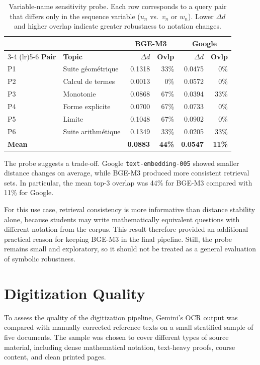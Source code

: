 \begin{table}[H]
\centering
\caption{Variable-name sensitivity probe. Each row corresponds to a query
pair that differs only in the sequence variable ($u_n$ vs.\ $v_n$ or
$w_n$). Lower $\Delta d$ and higher overlap indicate greater robustness to
notation changes.}
\label{tab:variable-sensitivity}
\small
\begin{tabular}{llrrrr}
\toprule
 & & \multicolumn{2}{c}{\textbf{BGE-M3}} & \multicolumn{2}{c}{\textbf{Google}} \\
\cmidrule(lr){3-4} \cmidrule(lr){5-6}
\textbf{Pair} & \textbf{Topic} & $\Delta d$ & \textbf{Ovlp} & $\Delta d$ & \textbf{Ovlp} \\
\midrule
P1 & Suite géométrique   & 0.1318 & 33\% & 0.0475 & 0\% \\
P2 & Calcul de termes    & 0.0013 & 0\%  & 0.0572 & 0\% \\
P3 & Monotonie           & 0.0868 & 67\% & 0.0394 & 33\% \\
P4 & Forme explicite     & 0.0700 & 67\% & 0.0733 & 0\% \\
P5 & Limite              & 0.1048 & 67\% & 0.0902 & 0\% \\
P6 & Suite arithmétique  & 0.1349 & 33\% & 0.0205 & 33\% \\
\midrule
\textbf{Mean} & & \textbf{0.0883} & \textbf{44\%} & \textbf{0.0547} & \textbf{11\%} \\
\bottomrule
\end{tabular}
\end{table}

The probe suggests a trade-off. Google \texttt{text-embedding-005} showed
smaller distance changes on average, while BGE-M3 produced more consistent
retrieval sets. In particular, the mean top-3 overlap was 44\% for BGE-M3
compared with 11\% for Google.

For this use case, retrieval consistency is more informative than distance
stability alone, because students may write mathematically equivalent
questions with different notation from the corpus. This result therefore
provided an additional practical reason for keeping BGE-M3 in the final
pipeline. Still, the probe remains small and exploratory, so it should not
be treated as a general evaluation of symbolic robustness.
\section{Digitization Quality}
\label{sec:ocr-evaluation}

To assess the quality of the digitization pipeline, Gemini's OCR output was
compared with manually corrected reference texts on a small stratified sample
of five documents. The sample was chosen to cover different types of source
material, including dense mathematical notation, text-heavy proofs, course
content, and clean printed pages.

